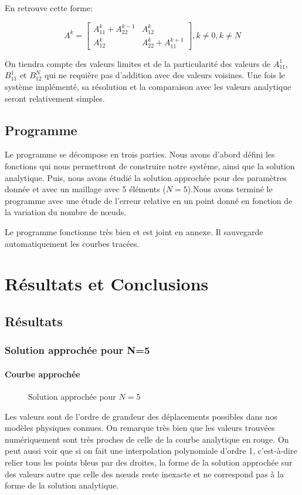 \documentclass[a4paper,10pt]{report} %
\begin{document}
En retrouve cette forme:

$$A^k =\begin{bmatrix}
A^k_11 + A^{k-1}_22 & A^k_12 \\
A^k_12 & A^k_22 + A^{k+1}_11
\end{bmatrix}, k \neq 0, k \neq N$$

On tiendra compte des valeurs limites et de la particularité des valeurs de $A^1_{11}$,$B^1_{11}$ et $B^N_{12}$ qui ne requière pas d'addition avec des valeurs voisines.
Une fois le système implémenté, sa résolution et la comparaison avec les valeurs analytique seront relativement simples.

\section{Programme}

Le programme se décompose en trois parties. Nous avons d'abord défini les fonctions qui nous permettront de construire notre système, ainsi que la solution analytique. Puis, nous avons étudié la solution approchée pour des paramètres donnée et avec un maillage avec 5 éléments ($N=5$).Nous avons terminé le programme avec une étude de l'erreur relative en un point donné en fonction de la variation du nombre de nœuds.

Le programme fonctionne très bien et est joint en annexe. Il sauvegarde automatiquement les courbes tracées.



\chapter{Résultats et Conclusions}

\section{Résultats}
 
\subsection{Solution approchée pour N=5}

\subsubsection{Courbe approchée}
\begin{figure}[H]
\begin{center}
\end{center}
\caption{Solution approchée pour $N=5$}
\label{U Uh N5}
\end{figure}
Les valeurs sont de l'ordre de grandeur des déplacements possibles dans nos modèles physiques connues.
On remarque très bien que les valeurs trouvées numériquement sont très proches de celle de la courbe analytique en rouge. On peut aussi voir que si on fait une interpolation polynomiale d'ordre 1, c'est-à-dire relier tous les points bleus par des droites, la forme de la solution approchée sur des valeurs autre que celle des nœuds reste inexacte et ne correspond pas à la forme de la solution analytique.
\end{document}
